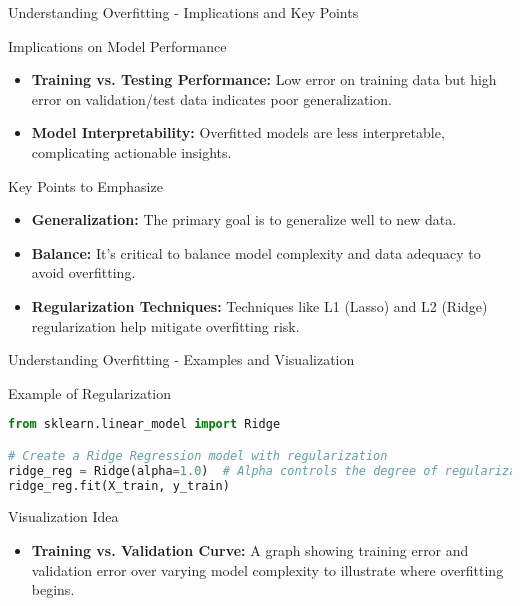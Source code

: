 \documentclass[aspectratio=169]{beamer}
\begin{document}
\begin{frame}[fragile]{Understanding Overfitting - Implications and Key Points}
    \begin{block}{Implications on Model Performance}
        \begin{itemize}
            \item \textbf{Training vs. Testing Performance:} Low error on training data but high error on validation/test data indicates poor generalization.
            \item \textbf{Model Interpretability:} Overfitted models are less interpretable, complicating actionable insights.
        \end{itemize}
    \end{block}
    
    \begin{block}{Key Points to Emphasize}
        \begin{itemize}
            \item \textbf{Generalization:} The primary goal is to generalize well to new data.
            \item \textbf{Balance:} It's critical to balance model complexity and data adequacy to avoid overfitting.
            \item \textbf{Regularization Techniques:} Techniques like L1 (Lasso) and L2 (Ridge) regularization help mitigate overfitting risk.
        \end{itemize}
    \end{block}
\end{frame}

\begin{frame}[fragile]{Understanding Overfitting - Examples and Visualization}
    \begin{block}{Example of Regularization}
        \begin{lstlisting}[language=Python]
from sklearn.linear_model import Ridge

# Create a Ridge Regression model with regularization
ridge_reg = Ridge(alpha=1.0)  # Alpha controls the degree of regularization
ridge_reg.fit(X_train, y_train)
        \end{lstlisting}
    \end{block}
    
    \begin{block}{Visualization Idea}
        \begin{itemize}
            \item \textbf{Training vs. Validation Curve:} A graph showing training error and validation error over varying model complexity to illustrate where overfitting begins.
        \end{itemize}
    \end{block}
\end{frame}
\end{document}
